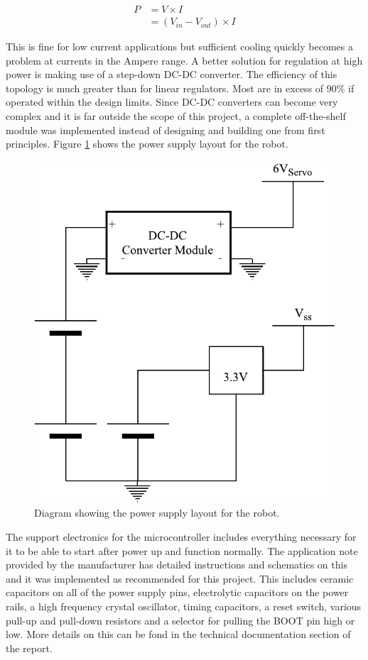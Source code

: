 \begin{align}
P &= V\times I\\
&= (V_{in}-V_{out})\times I
\end{align}

This is fine for low current applications but sufficient cooling quickly becomes a problem at currents in the Ampere range.
A better solution for regulation at high power is making use of a step-down DC-DC converter. The efficiency of this topology is much greater than for linear regulators. Most are in excess of $90\%$ if operated within the design limits. Since DC-DC converters can become very complex and it is far outside the scope of this project, a complete off-the-shelf module was implemented instead of designing and building one from first principles. Figure \ref{fig:PowerSupply} shows the power supply layout for the robot.

\begin{figure}[H]
\centering
\includegraphics[scale = 1]{pics/PowerSupply.pdf}
\caption{Diagram showing the power supply layout for the robot.}
\label{fig:PowerSupply}
\end{figure}

The support electronics for the microcontroller includes everything necessary for it to be able to start after power up and function normally. The application note provided by the manufacturer has detailed instructions and schematics on this and it was implemented as recommended for this project. This includes ceramic capacitors on all of the power supply pins, electrolytic capacitors on the power rails, a high frequency crystal oscillator, timing capacitors, a reset switch, various pull-up and pull-down resistors and a selector for pulling the BOOT pin high or low. More details on this can be fond in the technical documentation section of the report.\\

